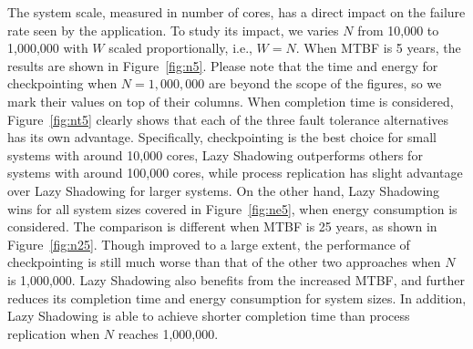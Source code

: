 The system scale, measured in number of cores, has a direct impact on the failure rate seen by the application. To study its impact, we varies $N$ from 10,000 to 1,000,000 with $W$ scaled proportionally, i.e., $W=N$. When MTBF is 5 years, the results are shown in Figure~\ref{fig:n5}. Please note that the time and energy for checkpointing when $N=1,000,000$ are beyond the scope of the figures, so we mark their values on top of their columns. When completion time is considered, Figure~\ref{fig:nt5} clearly shows that each of the three fault tolerance alternatives has its own advantage. Specifically, checkpointing is the best choice for small systems with around 10,000 cores, Lazy Shadowing outperforms others for systems with around 100,000 cores, while process replication has slight advantage over Lazy Shadowing for larger systems. On the other hand, Lazy Shadowing wins for all system sizes covered in Figure~\ref{fig:ne5}, when energy consumption is considered. The comparison is different when MTBF is 25 years, as shown in Figure~\ref{fig:n25}. Though improved to a large extent, the performance of checkpointing is still much worse than that of the other two approaches when $N$ is 1,000,000. Lazy Shadowing also benefits from the increased MTBF, and further reduces its completion time and energy consumption for system sizes. In addition, Lazy Shadowing is able to achieve shorter completion time than process replication when $N$ reaches 1,000,000.


